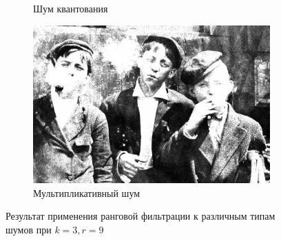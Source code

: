 \begin{figure}[ht!]
\begin{subfigure}[b]{0.5\linewidth}
      \caption{Шум квантования} 
      \label{rang_3_9:e}
    \end{subfigure}%
    \begin{subfigure}[b]{0.5\linewidth}
        \centering
        \includegraphics[width=0.95\linewidth]{../Rang_Filter/Rang_Speckle_noise_(k=3,r=9).jpg} 
        \caption{Мультипликативный шум} 
        \label{rang_3_9:f} 
    \end{subfigure} 
    \caption{Результат применения ранговой фильтрации к различным типам шумов при $k = 3, r = 9$}
    \label{img:rang_3_9} 
\end{figure}




